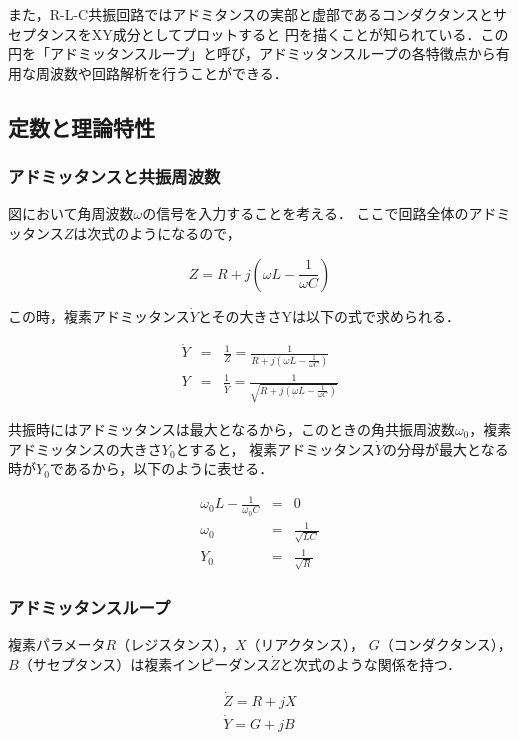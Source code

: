 \documentclass[dvipdfmx,titlepage,a4j]{jsarticle}  %
\numberwithin{equation}{section}
\begin{document}
また，R-L-C共振回路ではアドミタンスの実部と虚部であるコンダクタンスとサセプタンスをXY成分としてプロットすると
円を描くことが知られている．この円を「アドミッタンスループ」と呼び，アドミッタンスループの各特徴点から有用な周波数や回路解析を行うことができる．

\subsection{定数と理論特性}
\subsubsection{アドミッタンスと共振周波数}
図において角周波数$\omega$の信号を入力することを考える．
ここで回路全体のアドミッタンス$Z$は次式のようになるので，

\begin{equation}
  Z = R + j(\omega L - \frac{1}{\omega C})
\end{equation}

この時，複素アドミッタンス$\dot{Y}$とその大きさYは以下の式で求められる．

\begin{eqnarray}
  \dot{Y} &=& \frac{1}{Z} = \frac{1}{R + j(\omega L - \frac{1}{\omega C})} \\
  Y &=& \frac{1}{\dot{Y}} = \frac{1}{\sqrt{R + j(\omega L - \frac{1}{\omega C})}}
\end{eqnarray}

共振時にはアドミッタンスは最大となるから，このときの角共振周波数$\omega_0$，複素アドミッタンスの大きさ$Y_0$とすると，
複素アドミッタンス$\dot{Y}$の分母が最大となる時が$Y_0$であるから，以下のように表せる．

\begin{eqnarray}
  \omega_0 L - \frac{1}{\omega_0 C} &=& 0 \\
  \omega_0 &=& \frac{1}{\sqrt{LC}} \\
  Y_0 &=& \frac{1}{\sqrt{R}}
\end{eqnarray}

\subsubsection{アドミッタンスループ}

複素パラメータ$R$（レジスタンス），$X$（リアクタンス），
$G$（コンダクタンス），$B$（サセプタンス）は複素インピーダンス$\dot{Z}$と次式のような関係を持つ．

\begin{eqnarray}
  \dot{Z} = R + jX \\
  \dot{Y} = G + jB
\end{eqnarray}
\end{document}
